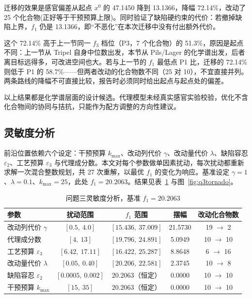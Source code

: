 迁移的效果是感官偏差从起点 $x^0$ 的 47.1450 降到 13.1366，降幅 72.14\%，改动了 25 个化合物(正好等于干预预算上限)。同时验证了缺陷硬约束的代价：若撤掉缺陷上界，$f_1$ 仍是 13.1366，即“不恶化”在本次迁移中没有付出额外代价。

这个 72.14\% 高于上一节同一 $f_3$ 档位（P3，7 个化合物）的 51.3\%，原因是起点不同：上一节从 Tripel 自身中位数出发，本节从 Pils/Lager 的化学谱出发，后者离目标远得多，可改进空间也大。若与上一节的 $f_1$ 最低点 P1 比，迁移的 72.14\% 则低于 P1 的 58.7\%——但两者改动的化合物数不同（25 对 10），不宜直接并列。两条路线的降幅不可直接比较，报告时必须同时给出起点与起点处的偏差。

以上结果都是化学谱层面的设计候选。代理模型未经真实感官实验校验，优化不含化合物间的协同与拮抗，只能作为配方调整的方向性建议。

\subsection{灵敏度分析}

前沿位置依赖六个设定：干预预算 $k_{\max}$、改动列代价 $\gamma$、改动量代价 $\lambda$、缺陷容忍 $\varepsilon_2$、工艺预算 $\varepsilon_3$ 与代理成分数。本文对每个参数做单因素扰动，每次扰动都重新求解一次混合整数规划，共 27 次重解，以最优 $f_1$ 的变化为响应。基准设定 $\gamma=1$、$\lambda=0.1$、$k_{\max}=25$，此处 $f_1=20.2063$。结果见表~\ref{tab:q3sens} 与图~\ref{fig:q3tornado}。

\begin{table}[htbp]
\centering
\footnotesize
\caption{问题三灵敏度分析，基准 $f_1=20.2063$}
\label{tab:q3sens}
\begin{tabular*}{\textwidth}{@{\extracolsep{\fill}}lcccc@{}}
\toprule
\textbf{参数} & \textbf{扰动范围} & \textbf{$f_1$ 范围} & \textbf{摆幅} & \textbf{改动化合物数} \\
\midrule
改动列代价 $\gamma$ & $[0.5,\ 4.0]$ & $[15.436,\ 37.009]$ & 21.5730 & 19 $\to$ 2 \\
代理成分数 & $[4,\ 13]$ & $[19.796,\ 24.891]$ & 5.0949 & 10 $\to$ 10 \\
工艺预算 $\varepsilon_3$ & $[6.42,\ 17.11]$ & $[16.422,\ 25.287]$ & 8.8648 & 6 $\to$ 16 \\
改动量代价 $\lambda$ & $[0.05,\ 0.40]$ & $[20.206,\ 22.581]$ & 2.3745 & 10 $\to$ 8 \\
缺陷容忍 $\varepsilon_2$ & $[0.0005,\ 0.002]$ & $20.2063$（恒定） & 0.0000 & 10 $\to$ 10 \\
干预预算 $k_{\max}$ & $[15,\ 35]$ & $20.2063$（恒定） & 0.0000 & 10 $\to$ 10 \\
\bottomrule
\end{tabular*}
\end{table}

